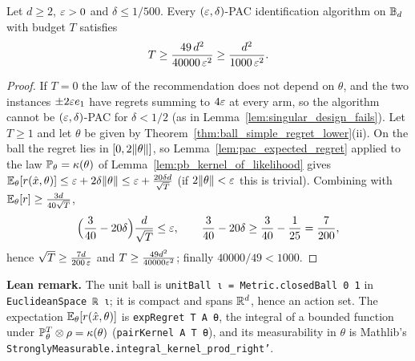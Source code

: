\begin{corollary}\label{cor:ball_pac_lower}
\leanok
{}
Let $d\ge2$, $\varepsilon>0$ and $\delta\le1/500$. Every $(\varepsilon,\delta)$-PAC identification algorithm
on $\mathbb{B}_d$ with budget $T$ satisfies
\[
  T\ge\frac{49\,d^2}{40000\,\varepsilon^2}\ge\frac{d^2}{1000\,\varepsilon^2} .
\]
\end{corollary}

\begin{proof}
\leanok
{}
If $T = 0$ the law of the recommendation does not depend on $\theta$, and the two instances
$\pm2\varepsilon e_1$ have regrets summing to $4\varepsilon$ at every arm, so the algorithm cannot be
$(\varepsilon,\delta)$-PAC for $\delta<1/2$ (as in Lemma~\ref{lem:singular_design_fails}).
Let $T\ge1$ and let $\theta$ be given by Theorem~\ref{thm:ball_simple_regret_lower}(ii). On
the ball the regret lies in $[0, 2\lVert \theta \rVert]$, so Lemma~\ref{lem:pac_expected_regret}
applied to the law $\mathbb{P}_\theta = \kappa(\theta)$ of Lemma~\ref{lem:pb_kernel_of_likelihood}
gives $\mathbb{E}_\theta[r(\hat{x},\theta)]\le\varepsilon+2\delta\lVert \theta \rVert\le\varepsilon+\frac{20\delta d}{\sqrt T}$
(if $2\lVert \theta \rVert < \varepsilon$ this is trivial). Combining
with $\mathbb{E}_\theta[r]\ge\frac{3d}{40\sqrt T}$,
\[
  \Big(\frac{3}{40}-20\delta\Big)\frac{d}{\sqrt T}\le\varepsilon,\qquad
  \frac{3}{40}-20\delta\ge\frac{3}{40}-\frac{1}{25} = \frac{7}{200},
\]
hence $\sqrt T\ge\frac{7d}{200\,\varepsilon}$ and $T\ge\frac{49d^2}{40000\varepsilon^2}$; finally
$40000/49<1000$.
\end{proof}

\textbf{Lean remark.} The unit ball is \texttt{unitBall ι = Metric.closedBall 0 1} in
\texttt{EuclideanSpace ℝ ι}; it is compact and spans $\mathbb{R}^d$, hence an action set. The
expectation $\mathbb{E}_\theta[r(\hat{x},\theta)]$ is \texttt{expRegret T A θ}, the integral of a bounded
function under $\mathbb{P}_\theta^T\otimes\rho = \kappa(\theta)$ (\texttt{pairKernel A T θ}), and its
measurability in $\theta$ is Mathlib's \texttt{StronglyMeasurable.integral\_kernel\_prod\_right'}.
